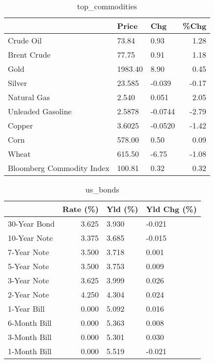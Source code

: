 \documentclass{article}%
\begin{document}
\begin{table}[htbp]%
\caption{top\_commodities}%
\centering%
\begin{adjustbox}{width=1\textwidth}%
\begin{tabular}{lllr}
\toprule
                          &   Price &     Chg &  \%Chg \\
\midrule
               Crude Oil  &   73.84 &    0.93 &  1.28 \\
             Brent Crude  &   77.75 &    0.91 &  1.18 \\
                    Gold  & 1983.40 &    8.90 &  0.45 \\
                  Silver  &  23.585 &  -0.039 & -0.17 \\
             Natural Gas  &   2.540 &   0.051 &  2.05 \\
       Unleaded Gasoline  &  2.5878 & -0.0744 & -2.79 \\
                  Copper  &  3.6025 & -0.0520 & -1.42 \\
                    Corn  &  578.00 &    0.50 &  0.09 \\
                   Wheat  &  615.50 &   -6.75 & -1.08 \\
Bloomberg Commodity Index &  100.81 &    0.32 &  0.32 \\
\bottomrule
\end{tabular}
%
\end{adjustbox}%
\end{table}

%


\begin{table}[htbp]%
\caption{us\_bonds}%
\centering%
\begin{adjustbox}{width=1\textwidth}%
\begin{tabular}{lrll}
\toprule
             &  Rate (\%) & Yld (\%) & Yld Chg (\%) \\
\midrule
30-Year Bond &     3.625 &   3.930 &      -0.021 \\
10-Year Note &     3.375 &   3.685 &      -0.015 \\
 7-Year Note &     3.500 &   3.718 &       0.001 \\
 5-Year Note &     3.500 &   3.753 &       0.009 \\
 3-Year Note &     3.625 &   3.999 &       0.026 \\
 2-Year Note &     4.250 &   4.304 &       0.024 \\
 1-Year Bill &     0.000 &   5.092 &       0.016 \\
6-Month Bill &     0.000 &   5.363 &       0.008 \\
3-Month Bill &     0.000 &   5.301 &       0.030 \\
1-Month Bill &     0.000 &   5.519 &      -0.021 \\
\bottomrule
\end{tabular}
%
\end{adjustbox}%
\end{table}
\end{document}
